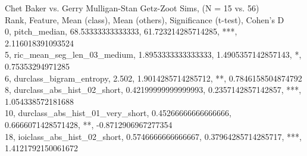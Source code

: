 Chet Baker vs. Gerry Mulligan-Stan Getz-Zoot Sims, (N = 15 vs. 56)\\
Rank, Feature, Mean (class), Mean (others), Significance (t-test), Cohen's D\\
0, pitch_median, 68.53333333333333, 61.723214285714285, ***, 2.116018391093524\\
5, ric_mean_seg_len_03_medium, 1.8953333333333333, 1.4905357142857143, *, 0.75353294971285\\
6, durclass_bigram_entropy, 2.502, 1.9014285714285712, **, 0.7846158504874792\\
8, durclass_abs_hist_02_short, 0.42199999999999993, 0.2357142857142857, ***, 1.054338572181688\\
10, durclass_abs_hist_01_very_short, 0.45266666666666666, 0.6666071428571428, **, -0.8712906967277354\\
18, ioiclass_abs_hist_02_short, 0.5746666666666667, 0.37964285714285717, ***, 1.4121792150061672\\
